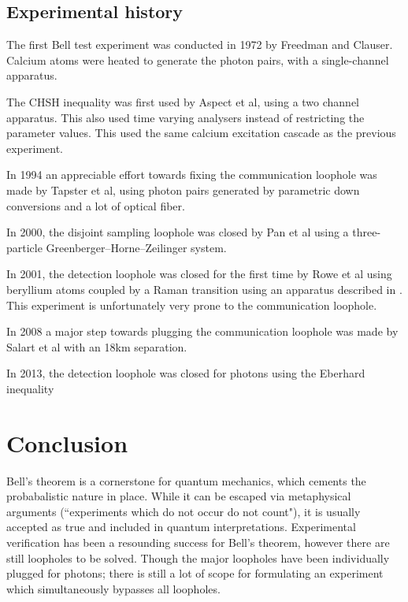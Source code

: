 \documentclass[10pt, twocolumn]{article}
\begin{document}
\subsection{Experimental history}
The first Bell test experiment was conducted in 1972 by Freedman and Clauser\cite{PhysRevLett.28.938}. Calcium atoms were heated to generate the photon pairs, with a single-channel apparatus.

The CHSH inequality was first used by Aspect et al\cite{PhysRevLett.49.1804}, using a two channel apparatus. This also used time varying analysers instead of restricting the parameter values. This used the same calcium excitation cascade as the previous experiment.

In 1994 an appreciable effort towards fixing the communication loophole was made by Tapster et al\cite{PhysRevLett.100.220404}, using  photon pairs generated by parametric down conversions and a lot of optical fiber.

In 2000, the disjoint sampling loophole was closed by Pan et al\cite{2000Natur.403..515P} using a three-particle Greenberger--Horne--Zeilinger\cite{2007arXiv0712.0921G} system.

In 2001, the detection loophole was closed for the first time by Rowe et al\cite{rowe2001experimental} using beryllium atoms coupled by a Raman transition using an apparatus described in \cite{sackett2000experimental}. This experiment is unfortunately very prone to the communication loophole.

In 2008 a major step towards plugging the communication loophole was made by Salart et al \cite{PhysRevLett.100.220404} with an 18km separation.

In 2013, the detection loophole was closed for photons\cite{giustina2013bell} using the Eberhard inequality\cite{eberhard1993background}
\section{Conclusion}
Bell's theorem is a cornerstone for quantum mechanics, which cements the probabalistic nature in place. While it can be escaped via metaphysical arguments (``experiments which do not occur do not count"), it is usually accepted as true and included in quantum interpretations. Experimental verification has been a resounding success for Bell's theorem, however there are still loopholes to be solved. Though the major loopholes have been individually plugged\cite{giustina2013bell}\cite{PhysRevLett.100.220404} for photons; there is still a lot of scope for formulating an experiment which simultaneously bypasses all loopholes.


\end{document}
